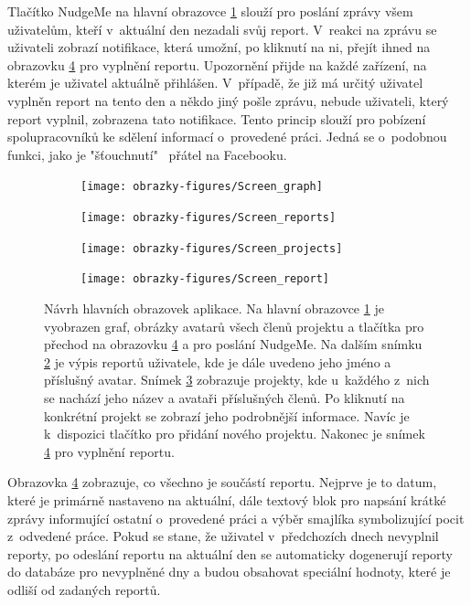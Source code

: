Tlačítko NudgeMe na hlavní obrazovce \ref{fig:hlavni} slouží pro poslání zprávy všem uživatelům, kteří v~aktuální den nezadali svůj report. V~reakci na zprávu se uživateli zobrazí notifikace, která umožní, po kliknutí na ni, přejít ihned na obrazovku \ref{fig:report} pro vyplnění reportu. Upozornění přijde na každé zařízení, na kterém je uživatel aktuálně přihlášen. V~případě, že již má určitý uživatel vyplněn report na tento den a někdo jiný pošle zprávu, nebude uživateli, který report vyplnil, zobrazena tato notifikace. Tento princip slouží pro pobízení spolupracovníků ke sdělení informací o~provedené práci. Jedná se o~podobnou funkci, jako je "šťouchnutí"~ přátel na Facebooku.

\begin{figure}[H]
    \centering
    \begin{subfigure}[b]{0.2\textwidth}
        \texttt{[image: obrazky-figures/Screen\_graph]}
        \caption{}
        \label{fig:hlavni}
    \end{subfigure}
    \begin{subfigure}[b]{0.2\textwidth}
        \texttt{[image: obrazky-figures/Screen\_reports]}
        \caption{}
        \label{fig:reporty}
    \end{subfigure}
    \begin{subfigure}[b]{0.2\textwidth}
        \texttt{[image: obrazky-figures/Screen\_projects]}
        \caption{}
        \label{fig:projekty}
    \end{subfigure}
    \begin{subfigure}[b]{0.2\textwidth}
        \texttt{[image: obrazky-figures/Screen\_report]}
        \caption{}
        \label{fig:report}
    \end{subfigure}
    \caption{Návrh hlavních obrazovek aplikace. Na hlavní obrazovce \ref{fig:hlavni} je vyobrazen graf, obrázky avatarů všech členů projektu a tlačítka pro přechod na obrazovku \ref{fig:report} a pro poslání NudgeMe. Na dalším snímku \ref{fig:reporty} je výpis reportů uživatele, kde je dále uvedeno jeho jméno a příslušný avatar. Snímek \ref{fig:projekty} zobrazuje projekty, kde u~každého z~nich se nachází jeho název a avataři příslušných členů. Po kliknutí na konkrétní projekt se zobrazí jeho podrobnější informace. Navíc je k~dispozici tlačítko pro přidání nového projektu. Nakonec je snímek \ref{fig:report} pro vyplnění reportu.}
    \label{fig:dulezite}
\end{figure}

Obrazovka \ref{fig:report} zobrazuje, co všechno je součástí reportu. Nejprve je to datum, které je primárně nastaveno na aktuální, dále textový blok pro napsání krátké zprávy informující ostatní o~provedené práci a výběr smajlíka symbolizující pocit z~odvedené práce. Pokud se stane, že uživatel v~předchozích dnech nevyplnil reporty, po odeslání reportu na aktuální den se automaticky dogenerují reporty do databáze pro nevyplněné dny a budou obsahovat speciální hodnoty, které je odliší od zadaných reportů. 
 
